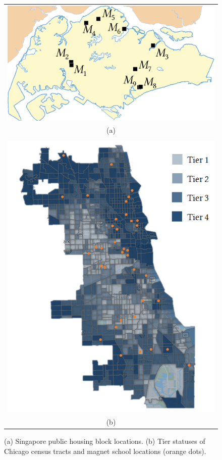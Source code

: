 \documentclass[11pt,dvipdfmx]{article}
\begin{document}
\begin{figure}
	\vspace{-12pt}
	\begin{center}
		\begin{tabular}[t]{c}
			\includegraphics[scale=0.057]{figs/Map01Final081.png}\\ 
			(a)\\
			\\
			\includegraphics[scale=0.19]{figs/Chicago_Tier_School.png}\\
			(b)
		\end{tabular}
	\end{center}
	\caption{(a) Singapore public housing block locations. (b) Tier statuses of Chicago census tracts and magnet school locations (orange dots). \label{figMap}}
\end{figure}
\end{document}
